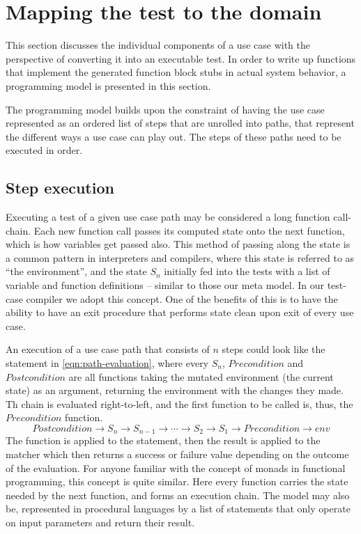 \section{Mapping the test to the domain}
This section discusses the individual components of a use case with the perspective of converting it into an executable test. In order to write up functions that implement the generated function block stubs in actual system behavior, a programming model is presented in this section.\medskip

\noindent The programming model builds upon the constraint of having the use case represented as an ordered list of steps that are unrolled into paths, that represent the different ways a use case can play out. The steps of these paths need to be executed in order.
\subsection{Step execution}
\label{ssec:step-execution}
\label{sec:use-case-environment}
Executing a test of a given use case path may be considered a long function call-chain. Each new function call passes its computed state onto the next function, which is how variables get passed also. This method of passing along the state is a common pattern in interpreters and compilers, where this state is referred to as ``the environment'', and the state $S_n$ initially fed into the tests with a list of variable and function definitions -- similar to those our meta model. In our test-case compiler we adopt this concept. One of the benefits of this is to have the ability to have an exit procedure that performs state clean upon exit of every use case.\medskip

\noindent An execution of a use case path that consists of $n$ steps could look like the statement in \ref{eqn:path-evaluation}, where every $S_n$, $Precondition$ and $Postcondition$ are all functions taking the mutated environment (the current state) as an argument, returning the environment with the changes they made. Th chain is evaluated right-to-left, and the first function to be called is, thus, the $Precondition$ function.
\begin{equation}
Postcondition \rightarrow S_n \rightarrow S_{n-1} \rightarrow \dotsb \rightarrow S_2 \rightarrow S_1 \rightarrow Precondition \rightarrow env
\label{eqn:path-evaluation}
\end{equation}
The function is applied to the statement, then the result is applied to the matcher which then returns a success or failure value depending on the outcome of the evaluation. For anyone familiar with the concept of monads in functional programming, this concept is quite similar. Here every function carries the state needed by the next function, and forms an execution chain. The model may also be, represented in procedural languages by a list of statements that only operate on input parameters and return their result.\medskip

